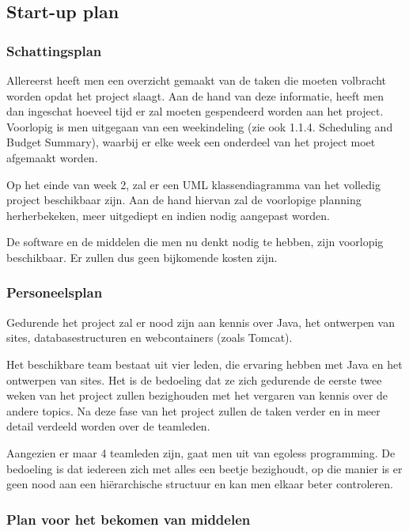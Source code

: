 \documentclass{article}
\begin{document}

\subsection{Start-up plan}

\subsubsection{Schattingsplan}

Allereerst heeft men een overzicht gemaakt van de taken die moeten volbracht worden opdat het project slaagt. Aan de hand van deze informatie, heeft men dan ingeschat hoeveel tijd er zal moeten gespendeerd worden aan het project. Voorlopig is men uitgegaan van een weekindeling (zie ook  1.1.4. Scheduling and Budget Summary), waarbij er elke week een onderdeel van het project moet afgemaakt worden. 

Op het einde van week 2, zal er een UML klassendiagramma van het volledig project beschikbaar zijn. Aan de hand hiervan zal de voorlopige planning herherbekeken, meer uitgediept en indien nodig aangepast worden.

De software en de middelen die men nu denkt nodig te hebben, zijn voorlopig beschikbaar. Er zullen dus geen bijkomende kosten zijn.

\subsubsection{Personeelsplan}

Gedurende het project zal er nood zijn aan kennis over Java, het ontwerpen van sites, databasestructuren en  webcontainers (zoals Tomcat). 

Het beschikbare team bestaat uit vier leden, die ervaring hebben met Java en het ontwerpen van sites. Het is de bedoeling dat ze zich gedurende de eerste twee weken van het project zullen bezighouden met het vergaren van kennis over de andere topics. Na deze fase van het project zullen de taken verder en in meer detail verdeeld worden over de teamleden.

Aangezien er maar 4 teamleden zijn, gaat men uit van egoless programming. De bedoeling is dat iedereen zich met alles een beetje bezighoudt, op die manier is er geen nood aan een hi\"{e}rarchische structuur en kan men elkaar beter controleren. 

\subsubsection{Plan voor het bekomen van middelen}
\end{document}
